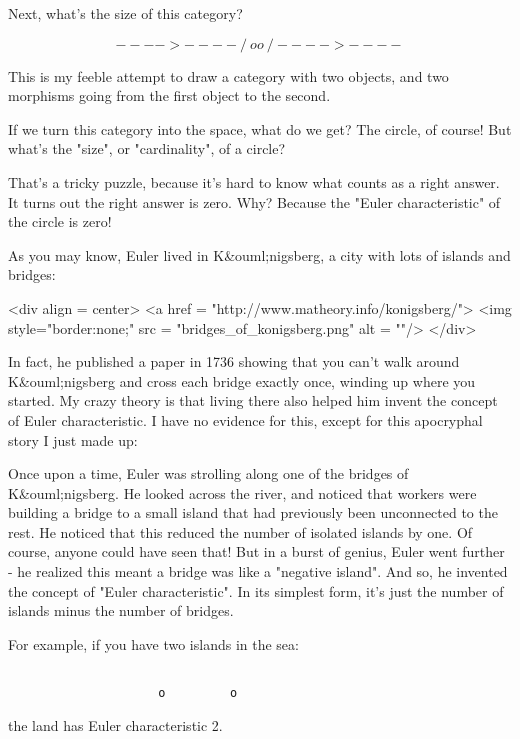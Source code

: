 Next, what's the size of this category?


$$

                     ---->---- 
                    /         \
                   o           o
                    \         /
                     ---->----
$$
    
This is my feeble attempt to draw a category with two objects, and two 
morphisms going from the first object to the second.

If we turn this category into the space, what do we get?  The circle,
of course!  But what's the "size", or
"cardinality", of a circle?

That's a tricky puzzle, because it's hard to know what counts as a
right answer.  It turns out the right answer is zero.  Why?  Because
the "Euler characteristic" of the circle is zero!

As you may know, Euler lived in K&ouml;nigsberg, a city with lots of
islands and bridges:

<div align = center>
<a href = "http://www.matheory.info/konigsberg/">
<img style="border:none;" src = "bridges_of_konigsberg.png" alt = ""/>
</div>

In fact, he published a paper in 1736 showing
that you can't walk around K&ouml;nigsberg and cross each bridge
exactly once, winding up where you started.  
My crazy theory is that
living there also helped him invent the concept of Euler
characteristic.  I have no evidence for this, except for this
apocryphal story I just made up:

Once upon a time, Euler was strolling along one of the bridges of
K&ouml;nigsberg.  He looked across the river, and noticed that workers
were building a bridge to a small island that had previously been
unconnected to the rest.  He noticed that this reduced the number of
isolated islands by one.  Of course, anyone could have seen that!
But in a burst of genius, Euler went further - he realized this meant
a bridge was like a "negative island".  And so, he invented
the concept of "Euler characteristic".  In its simplest
form, it's just the number of islands minus the number of bridges.

For example, if you have two islands in the sea:


\begin{verbatim}

                     o         o
\end{verbatim}
    
the land has Euler characteristic 2.

